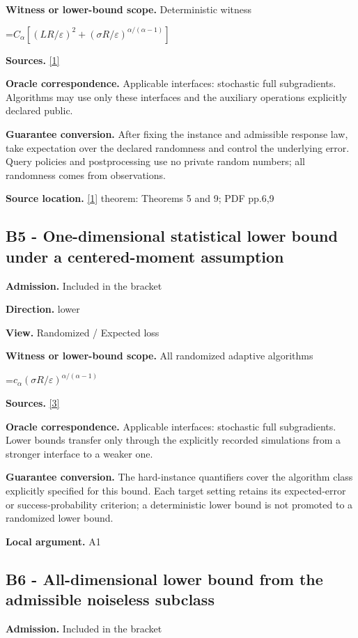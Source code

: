 \documentclass[10pt,a4paper]{article}
\newcommand{\AtlasMath}[1]{\par\begingroup\centering\setbox0=\hbox{$\displaystyle #1$}\ifdim\wd0>1.4\linewidth\typeout{ATLAS WIDE FORMULA: \the\wd0}\fi\ifdim\wd0>\linewidth\resizebox{\linewidth}{!}{\box0}\else\box0\fi\par\endgroup}
\begin{document}
\textbf{Witness or lower-bound scope.} Deterministic witness

\AtlasMath{C_\alpha[(LR/\varepsilon)^2+(\sigma R/\varepsilon)^{\alpha/(\alpha-1)}]}
\textbf{Sources.} \href{https://arxiv.org/pdf/2303.12277}{[1]}

\textbf{Oracle correspondence.} Applicable interfaces: stochastic full subgradients. Algorithms may use only these interfaces and the auxiliary operations explicitly declared public.

\textbf{Guarantee conversion.} After fixing the instance and admissible response law, take expectation over the declared randomness and control the underlying error. Query policies and postprocessing use no private random numbers; all randomness comes from observations.

\textbf{Source location.} \href{https://arxiv.org/pdf/2303.12277}{[1]} theorem: Theorems 5 and 9; PDF pp.6,9

\subsection{B5 - One-dimensional statistical lower bound under a centered-moment assumption}
\textbf{Admission.} Included in the bracket

\textbf{Direction.} lower

\textbf{View.} Randomized / Expected loss

\textbf{Witness or lower-bound scope.} All randomized adaptive algorithms

\AtlasMath{c_\alpha (\sigma R/\varepsilon)^{\alpha/(\alpha-1)}}
\textbf{Sources.} \href{https://arxiv.org/pdf/2609.10874}{[3]}

\textbf{Oracle correspondence.} Applicable interfaces: stochastic full subgradients. Lower bounds transfer only through the explicitly recorded simulations from a stronger interface to a weaker one.

\textbf{Guarantee conversion.} The hard-instance quantifiers cover the algorithm class explicitly specified for this bound. Each target setting retains its expected-error or success-probability criterion; a deterministic lower bound is not promoted to a randomized lower bound.

\textbf{Local argument.} A1

\subsection{B6 - All-dimensional lower bound from the admissible noiseless subclass}
\textbf{Admission.} Included in the bracket
\end{document}
